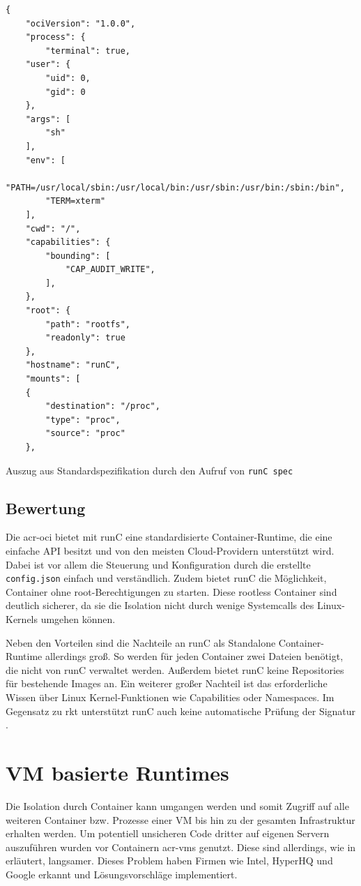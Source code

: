 \newpage

\begin{listing}[H]
	\begin{verbatim}
{
	"ociVersion": "1.0.0",
	"process": {
		"terminal": true,
	"user": {
		"uid": 0,
		"gid": 0
	},
	"args": [
		"sh"
	],
	"env": [
		"PATH=/usr/local/sbin:/usr/local/bin:/usr/sbin:/usr/bin:/sbin:/bin",
		"TERM=xterm"
	],
	"cwd": "/",
	"capabilities": {
		"bounding": [
			"CAP_AUDIT_WRITE",
		],
	},
	"root": {
		"path": "rootfs",
		"readonly": true
	},
	"hostname": "runC",
	"mounts": [
	{
		"destination": "/proc",
		"type": "proc",
		"source": "proc"
	},
	\end{verbatim}
	\caption{Auszug aus Standardspezifikation durch den Aufruf von \texttt{runC spec}}
	\label{lst:configJSON}
\end{listing}


\subsection{Bewertung}
\label{sec:comprunCBewertung}

Die \gls{acr-oci} bietet mit runC eine standardisierte Container-Runtime, die eine einfache API besitzt und von den meisten Cloud-Providern unterstützt wird. Dabei ist vor allem die Steuerung und Konfiguration durch die erstellte \texttt{config.json} einfach und verständlich. Zudem bietet runC die Möglichkeit, Container ohne root-Berechtigungen zu starten. Diese rootless Container sind deutlich sicherer, da sie die Isolation nicht durch wenige Systemcalls des Linux-Kernels umgehen können.

Neben den Vorteilen sind die Nachteile an runC als Standalone Container-Runtime allerdings groß. So werden für jeden Container zwei Dateien benötigt, die nicht von runC verwaltet werden. Außerdem bietet runC keine Repositories für bestehende Images an. Ein weiterer großer Nachteil ist das erforderliche Wissen über Linux Kernel-Funktionen wie Capabilities oder Namespaces. Im Gegensatz zu rkt unterstützt runC auch keine automatische Prüfung der Signatur \citep{RktVsOtherProjects}. 

\section{VM basierte Runtimes}
\label{sec:compVMbased}
Die Isolation durch Container kann umgangen werden und somit Zugriff auf alle weiteren Container bzw. Prozesse einer VM bis hin zu der gesamten Infrastruktur erhalten werden. Um potentiell unsicheren Code dritter auf eigenen Servern auszuführen wurden vor Containern \glspl{acr-vm} genutzt. Diese sind allerdings, wie in  erläutert, langsamer. Dieses Problem haben Firmen wie Intel, HyperHQ und Google erkannt und Lösungsvorschläge implementiert.

